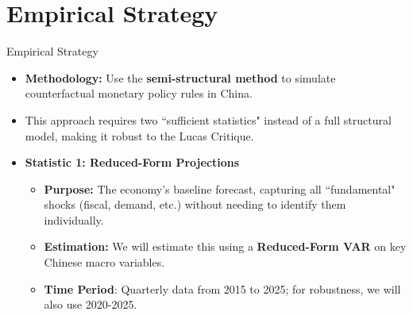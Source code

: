 \documentclass{beamer}
\begin{document}
\section{Empirical Strategy}
\begin{frame}{Empirical Strategy}
\begin{itemize}
    \item \textbf{Methodology:} Use the \textbf{semi-structural method} \parencite{McKayWolf2023,CaravelloEtAl2024} to simulate counterfactual monetary policy rules in China.
    \item This approach requires two ``sufficient statistics" instead of a full structural model, making it robust to the Lucas Critique.
   
    \item \textbf{Statistic 1: Reduced-Form Projections}
    \begin{itemize}
        \item \textbf{Purpose:} The economy's baseline forecast, capturing all ``fundamental" shocks (fiscal, demand, etc.) without needing to identify them individually.
        \item \textbf{Estimation:} We will estimate this using a \textbf{Reduced-Form VAR} on key Chinese macro variables.
        \item \textbf{Time Period}: Quarterly data from 2015 to 2025; for robustness, we will also use 2020-2025.
    \end{itemize}
  \end{itemize}
\end{frame}
\end{document}
